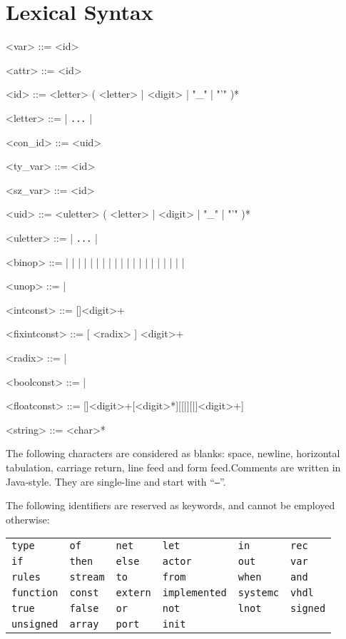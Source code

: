 \section*{Lexical Syntax}

\begin{grammar}
<var> ::= <id>

<attr> ::= <id>

<id> ::= <letter> ( <letter> | <digit> | "_" | "'" )*

<letter> ::=  | \texttt{...} | 

<con_id> ::= <uid>       %

<ty_var> ::= \lit{\$} <id>

<sz_var> ::= <id>

<uid> ::= <uletter> ( <letter> | <digit> | "_" | "'" )*

<uletter> ::=  | \texttt{...} | 

<binop> ::= \lit{+} | \lit{-} | \lit{*} | \lit{/} |  
          |  |  |  |  
          | \lit{\verb|<|} | \lit{\verb|>|} | \lit{\verb|<=|} | \lit{\verb|>=|} | \lit{=} | \lit{!=}
          | \lit{\&\&} | \lit{||} 
          |  |  |  \lit{\verb|<<|} | \lit{\verb|>>|}

<unop> ::= \lit{-} | \lit{!}

<intconst>    ::= [\lit{-}]<digit>+

<fixintconst>    ::= [ <radix> ] <digit>+ 

<radix>  ::=  | 

<boolconst>   ::=  | 

<floatconst>  ::= [\lit{-}]<digit>+[<digit>*][[|][\lit{+}|\lit{-}]<digit>+]

<string> ::= \lit{\"} <char>* \lit{\"}
\end{grammar}

The following characters are considered as blanks: space, newline, horizontal tabulation, carriage
return, line feed and form feed.Comments are written in Java-style. They are single-line and start
with ``\texttt{--}''.

\medskip
The following identifiers are reserved as keywords, and cannot be employed otherwise:

\begin{tabular}[c]{llllll}
\texttt{type} & \texttt{of} & \texttt{net} & \texttt{let} & \texttt{in} & \texttt{rec} \\
\texttt{if} & \texttt{then} & \texttt{else} & \texttt{actor} & \texttt{out} & \texttt{var} \\
\texttt{rules} & \texttt{stream} & \texttt{to} & \texttt{from} & \texttt{when} & \texttt{and} \\
\texttt{function} & \texttt{const} & \texttt{extern} & \texttt{implemented} & \texttt{systemc} & \texttt{vhdl} \\
\texttt{true} & \texttt{false} & \texttt{or} & \texttt{not} & \texttt{lnot} & \texttt{signed} \\
\texttt{unsigned} & \texttt{array} & \texttt{port} & \texttt{init}
\end{tabular}

